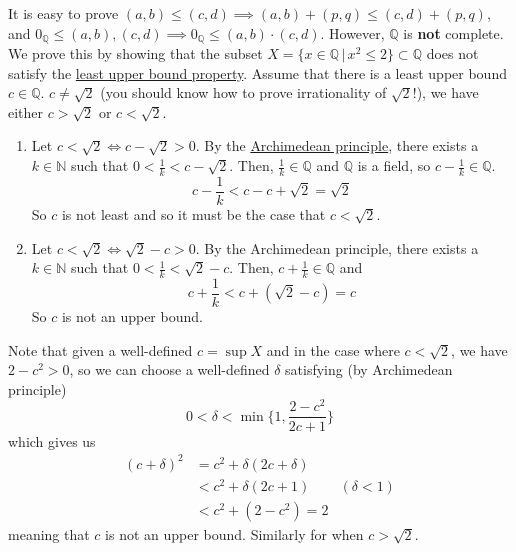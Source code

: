 \begin{solution}
\begin{enumerate}
    \end{enumerate}
    It is easy to prove $(a, b) \leq (c, d) \implies (a, b) + (p, q) \leq (c, d) + (p, q)$, and $0_{\mathbb{Q}} \leq (a, b), (c, d) \implies 0_\mathbb{Q} \leq (a, b) \cdot (c, d)$. However, $\mathbb{Q}$ is \textbf{not} complete. We prove this by showing that the subset $X = \{x \in \mathbb{Q} \,|\,x^2 \leq 2 \} \subset \mathbb{Q}$ does not satisfy the \hyperref[def:least-upper-bound-property]{least upper bound property}. Assume that there is a least upper bound $c \in \mathbb{Q}$. $c \neq \sqrt{2}$ (you should know how to prove irrationality of $\sqrt{2}$!), we have either $c > \sqrt{2}$ or $c < \sqrt{2}$. 
    \begin{enumerate}
      \item Let $c < \sqrt{2} \iff c - \sqrt{2} > 0$. By the \hyperref[def:archimedean-principle]{Archimedean principle}, there exists a $k \in \mathbb{N}$ such that $0 < \frac{1}{k} < c - \sqrt{2}$. Then, $\frac{1}{k} \in \mathbb{Q}$ and $\mathbb{Q}$ is a field, so $c - \frac{1}{k} \in \mathbb{Q}$. 
      \begin{equation}
        c - \frac{1}{k} < c - c + \sqrt{2} = \sqrt{2}
      \end{equation}
      So $c$ is not least and so it must be the case that $c < \sqrt{2}$. 
      \item Let $c < \sqrt{2} \iff \sqrt{2} - c > 0$. By the Archimedean principle, there exists a $k \in \mathbb{N}$ such that $0 < \frac{1}{k} < \sqrt{2} - c$. Then, $c + \frac{1}{k} \in \mathbb{Q}$ and 
      \begin{equation}
        c + \frac{1}{k} < c + (\sqrt{2} - c) = c
      \end{equation}
      So $c$ is not an upper bound. 
    \end{enumerate}
    Note that given a well-defined $c = \sup{X}$ and in the case where $c < \sqrt{2}$, we have $2 - c^2 > 0$, so we can choose a well-defined $\delta$ satisfying (by Archimedean principle) 
    \begin{equation}
      0 < \delta < \min \bigg\{1, \frac{2 - c^2}{2c + 1} \bigg\}
    \end{equation}
    which gives us 
    \begin{align*}
      (c + \delta)^2 & = c^2 + \delta(2c + \delta) & \\
      & < c^2 + \delta (2 c + 1) & (\delta < 1) \\
      & < c^2 + (2 - c^2) = 2 & 
    \end{align*}
    meaning that $c$ is not an upper bound. Similarly for when $c > \sqrt{2}$. 
  \end{solution}

